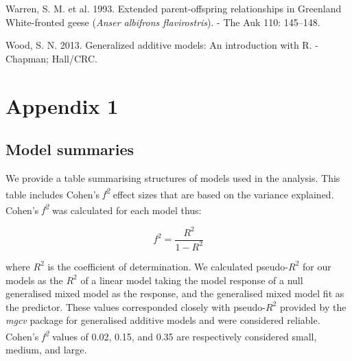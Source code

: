 \documentclass[10pt,twocolumn]{paper}
\begin{document}
\hypertarget{ref-10.2307ux2f4088245}{}
Warren, S. M. et al. 1993. Extended parent-offspring relationships in
Greenland White-fronted geese (\emph{Anser albifrons flavirostris}). -
The Auk 110: 145--148.

\hypertarget{ref-wood2013gam}{}
Wood, S. N. 2013. Generalized additive models: An introduction with R. -
Chapman; Hall/CRC.

\newpage

\setcounter{table}{0} \renewcommand{\thetable}{A\arabic{table}}

\section{Appendix 1}\label{appendix-1}

\subsection{Model summaries}\label{model-summaries}

We provide a table summarising structures of models used in the
analysis. This table includes Cohen's \emph{f\textsuperscript{2}} effect
sizes that are based on the variance explained. Cohen's
\emph{f\textsuperscript{2}} was calculated for each model thus:

\begin{equation} f^2 =  \frac{R^2}{1 - R^2} \end{equation}

where \(R^2\) is the coefficient of determination. We calculated
pseudo-\(R^2\) for our models as the \(R^2\) of a linear model taking
the model response of a null generalised mixed model as the response,
and the generalised mixed model fit as the predictor. These values
corresponded closely with pseudo-\(R^2\) provided by the \emph{mgcv}
package for generalised additive models and were considered reliable.
Cohen's \emph{f\textsuperscript{2}} values of 0.02, 0.15, and 0.35 are
respectively considered small, medium, and large.
\end{document}
